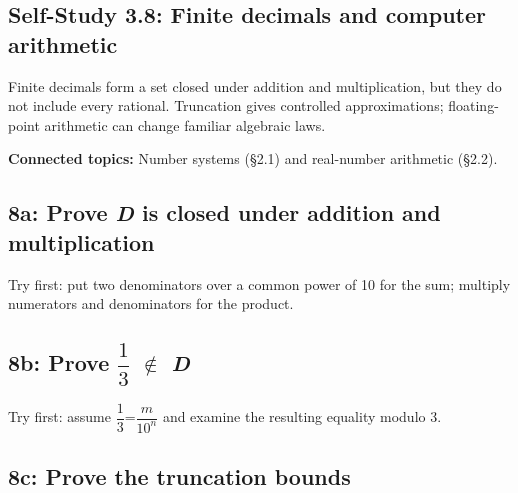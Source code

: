 \documentclass[11pt]{article}
\begin{document}
\begin{keepsection}
\section{Self-Study 3.8: Finite decimals and computer arithmetic}

Finite decimals form a set closed under addition and multiplication, but they do not include every rational. Truncation gives controlled approximations; floating-point arithmetic can change familiar algebraic laws.

\textbf{Connected topics:} Number systems (§2.1) and real-number arithmetic (§2.2).

\begin{keepsection}
\subsection{8a: Prove \textit{D} is closed under addition and multiplication}

Try first: put two denominators over a common power of 10 for the sum; multiply numerators and denominators for the product.

\end{keepsection}

\begin{keepsection}
\subsection{8b: Prove {\small\ensuremath{\dfrac{1}{3}}} \ensuremath{\notin} \textit{D}}

Try first: assume {\small\ensuremath{\dfrac{1}{3}}}={\small\ensuremath{\dfrac{{m}}{10^{{n}}}}} and examine the resulting equality modulo 3.

\end{keepsection}

\begin{keepsection}
\subsection{8c: Prove the truncation bounds}


\end{keepsection}
\end{keepsection}
\end{document}
